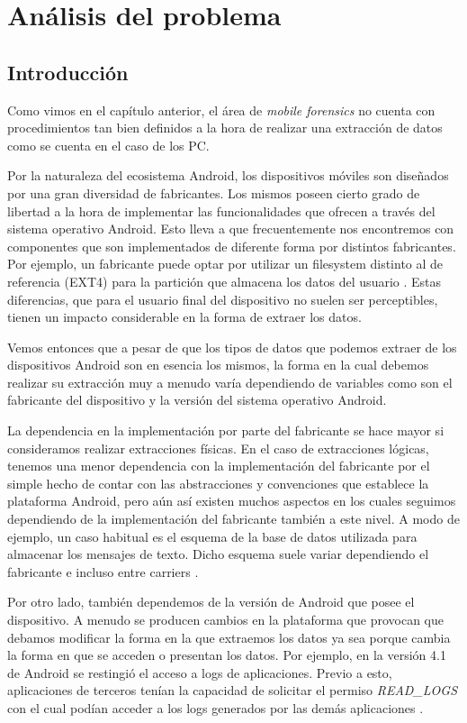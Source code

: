 \chapter{Análisis del problema} \label{chap:Analisis}

\section{Introducción}
Como vimos en el capítulo anterior, el área de \emph{mobile forensics} no cuenta con procedimientos tan bien definidos a la hora de realizar una extracción de datos como se cuenta en el caso de los PC.

Por la naturaleza del ecosistema Android, los dispositivos móviles son diseñados por una gran diversidad de fabricantes. Los mismos poseen cierto grado de libertad a la hora de implementar las funcionalidades que ofrecen a través del sistema operativo Android. Esto lleva a que frecuentemente nos encontremos con componentes que son implementados de diferente forma por distintos fabricantes. Por ejemplo, un fabricante puede optar por utilizar un filesystem distinto al de referencia (EXT4) para la partición que almacena los datos del usuario \cite{adrdstrg}. Estas diferencias, que para el usuario final del dispositivo no suelen ser perceptibles, tienen un impacto considerable en la forma de extraer los datos.

Vemos entonces que a pesar de que los tipos de datos que podemos extraer de los dispositivos Android son en esencia los mismos, la forma en la cual debemos realizar su extracción muy a menudo varía dependiendo de variables como son el fabricante del dispositivo y la versión del sistema operativo Android.

La dependencia en la implementación por parte del fabricante se hace mayor si consideramos realizar extracciones físicas. En el caso de extracciones lógicas, tenemos una menor dependencia con la implementación del fabricante por el simple hecho de contar con las abstracciones y convenciones que establece la plataforma Android, pero aún así existen muchos aspectos en los cuales seguimos dependiendo de la implementación del fabricante también a este nivel. A modo de ejemplo, un caso habitual es el esquema de la base de datos utilizada para almacenar los mensajes de texto. Dicho esquema suele variar dependiendo el fabricante e incluso entre carriers \cite{delsms}.

Por otro lado, también dependemos de la versión de Android que posee el dispositivo. A menudo se producen cambios en la plataforma que provocan que debamos modificar la forma en la que extraemos los datos ya sea porque cambia la forma en que se acceden o presentan los datos. Por ejemplo, en la versión 4.1 de Android se restingió el acceso a logs de aplicaciones. Previo a esto, aplicaciones de terceros tenían la capacidad de solicitar el permiso \emph{READ\_LOGS} con el cual podían acceder a los logs generados por las demás aplicaciones \cite{logaccss}.

